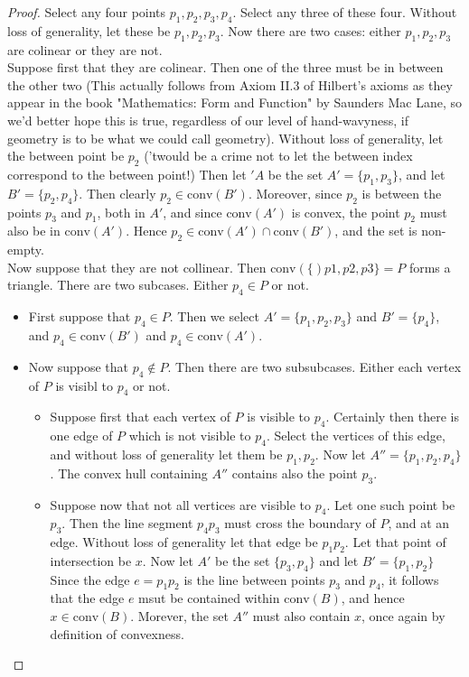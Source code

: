 \documentclass[12pt]{article}
\newcommand{\conv}[1]{\mbox{conv}(#1)}
\theoremstyle{definition}
\begin{document}
\begin{proof}

Select any four points $p_1,p_2,p_3,p_4$. Select any three of these four. Without loss of generality, let these be $p_1,p_2,p_3$. Now there are two cases: either $p_1,p_2,p_3$ are colinear or they are not.\\

Suppose first that they are colinear. Then one of the three must be in between the other two (This actually follows from Axiom II.3 of Hilbert's axioms as they appear in the book "Mathematics: Form and Function" by Saunders Mac Lane, so we'd better hope this is true, regardless of our level of hand-wavyness, if geometry is to be what we could call geometry). Without loss of generality, let the between point be $p_2$ ('twould be a crime not to let the between index correspond to the between point!) Then let $'A$ be the set $A' = \{p_1,p_3\}$, and let $B' = \{p_2,p_4\}$. Then clearly $p_2\in \conv{B'}$. Moreover, since $p_2 $ is between the points $p_3$ and $p_1$, both in $A'$, and since $\conv{A'}$ is convex, the point $p_2$ must also be in $\conv{A'}$. Hence $p_2\in \conv{A'}\cap \conv{B'}$, and the set is non-empty.\\

Now suppose that they are not collinear. Then $\conv\{p1,p2,p3\} = P$ forms a triangle. There are two subcases. Either $p_4\in P$ or not. 
\begin{itemize}
\item First suppose that $ p_4\in P $. Then we select $A' = \{p_1,p_2,p_3\}$ and $B' = \{p_4\}$, and $p_4\in \conv{B'}$ and $p_4\in \conv{A'}$.
\item Now suppose that $p_4\not\in P$. Then there are two subsubcases. Either each vertex of $P$ is visibl to $p_4$ or not. 
\begin{itemize}
\item Suppose first that each vertex of $P$ is visible to $p_4$. Certainly then there is one edge of $P$ which is not visible to $p_4$. Select the vertices of this edge, and without loss of generality let them be $p_1,p_2$. Now let $A'' = \{p_1, p_2,p_4\}$. The convex hull containing $A''$ contains also the point $ p_3 $. 
\item Suppose now that not all vertices are visible to $p_4$. Let one such point be $p_3$. Then the line segment $p_4p_3$ must cross the boundary of $P$, and at an edge. Without loss of generality let that edge be $p_1p_2$. Let that point of intersection be $x$. Now let $A'$ be the set $ \{p_3, p_4\} $ and let $B' = \{p_1,p_2\}$ Since the edge $e = p_1p_2$ is the line between points $p_3$ and $p_4$, it follows that the edge $e$ msut be contained within $\conv{B}$, and hence $x\in \conv{B}$. Morever, the set $A''$ must also contain $x$, once again by definition of convexness. 
\end{itemize}
\end{itemize}
\end{proof}
\end{document}
